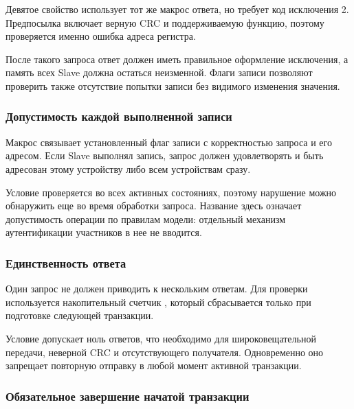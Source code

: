 Девятое свойство использует тот же макрос ответа, но требует код
исключения 2. Предпосылка включает верную CRC и поддерживаемую функцию,
поэтому проверяется именно ошибка адреса регистра.


После такого запроса ответ должен иметь правильное оформление исключения,
а память всех Slave должна остаться неизменной. Флаги записи позволяют
проверить также отсутствие попытки записи без видимого изменения значения.

\subsubsection{Допустимость каждой выполненной записи}

Макрос  связывает установленный флаг записи
с корректностью запроса и его адресом. Если Slave выполнял запись,
запрос должен удовлетворять  и быть адресован
этому устройству либо всем устройствам сразу.


Условие проверяется во всех активных состояниях, поэтому нарушение можно
обнаружить еще во время обработки запроса.
Название  здесь означает
допустимость операции по правилам модели: отдельный механизм
аутентификации участников в нее не вводится.

\subsubsection{Единственность ответа}

Один запрос не должен приводить к нескольким ответам. Для проверки
используется накопительный счетчик , который
сбрасывается только при подготовке следующей транзакции.


Условие допускает ноль ответов, что необходимо для широковещательной
передачи, неверной CRC и отсутствующего получателя. Одновременно оно
запрещает повторную отправку в любой момент активной транзакции.

\subsubsection{Обязательное завершение начатой транзакции}

